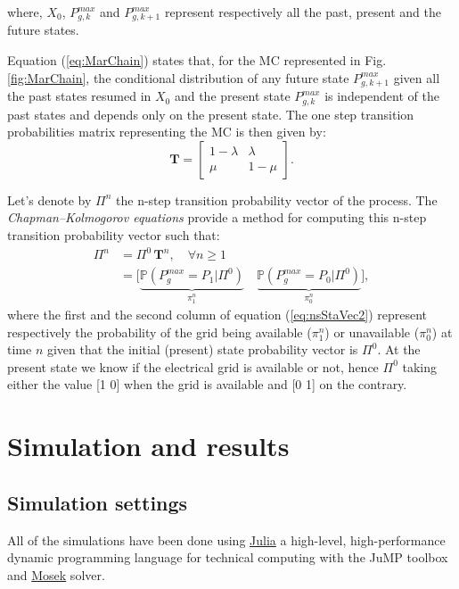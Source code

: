 \documentclass[conference]{IEEEtran}
\begin{document}
where, $X_0$, $P^{max}_{g,k}$ and $P^{max}_{g,k+1}$ represent respectively all the past,  present and the future states. 

Equation (\ref{eq:MarChain}) states that, for the MC represented in Fig. \ref{fig:MarChain}, the conditional distribution of any future state $P^{max}_{g,k+1}$ given all the past states resumed in $X_0$ and the present state $P^{max}_{g,k}$ is independent of the past states and
depends only on the present state. The one step transition probabilities matrix representing the MC is then given by: 
\begin{equation}\label{eq:MarChain_TransMat}
\mathbf{T} = 
  \begin{bmatrix}
 1-\lambda  & \lambda \\ 
 \mu & 1- \mu
\end{bmatrix} . 
\end{equation}

Let's denote by $\Pi^n$ the n-step transition probability vector of the process. The \textit{Chapman–Kolmogorov equations} provide a method for computing this n-step  transition probability vector such that: 
\begin{subequations}
    \begin{align}
    \Pi^n & = \Pi^0 \, \mathbf{T}^n, \quad \forall n \geq 1 \label{eq:nsStaVec1} \\
          & = \bigl[ \underbrace{\mathbb{P} (P_g^{max} = P_1 | \Pi^0)}_{\pi^n_1}\quad \underbrace{\mathbb{P} (P_g^{max} = P_0 | \Pi^0)}_{\pi_{0}^n} \bigl] \label{eq:nsStaVec2},
\end{align}
\end{subequations}
where the first and the second column of equation (\ref{eq:nsStaVec2}) represent respectively the probability of the grid being available ($\pi_{1}^n$) or unavailable ($\pi_{0}^n$) at time $n$ given that the initial (present) state probability vector  is $\Pi^0$. At the present state we know if the electrical grid is available or not, hence $\Pi^0$ taking either the value [1 0] when the grid is available and [0 1] on the contrary.


 \section{Simulation and results}
 
 \subsection{Simulation settings}
 All of the simulations have been done using \href{http://www.juliaopt.org/}{Julia} a high-level, high-performance dynamic programming language for technical computing with the JuMP toolbox and \href{https://www.mosek.com/}{Mosek} solver. 
 
\end{document}
